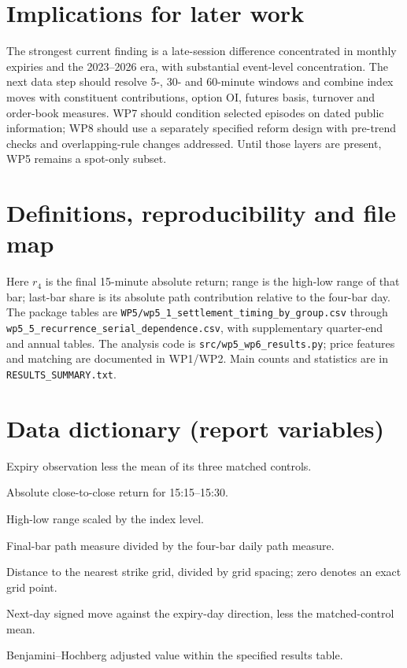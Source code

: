\documentclass[11pt,a4paper]{article}
\begin{document}
\section{Implications for later work}
The strongest current finding is a late-session difference concentrated in monthly expiries and the 2023--2026 era, with substantial event-level concentration. The next data step should resolve 5-, 30- and 60-minute windows and combine index moves with constituent contributions, option OI, futures basis, turnover and order-book measures. WP7 should condition selected episodes on dated public information; WP8 should use a separately specified reform design with pre-trend checks and overlapping-rule changes addressed. Until those layers are present, WP5 remains a spot-only subset.

\appendix
\section{Definitions, reproducibility and file map}
Here $r_4$ is the final 15-minute absolute return; range is the high-low range of that bar; last-bar share is its absolute path contribution relative to the four-bar day. The package tables are \texttt{WP5/wp5\_1\_settlement\_timing\_by\_group.csv} through \texttt{wp5\_5\_recurrence\_serial\_dependence.csv}, with supplementary quarter-end and annual tables. The analysis code is \texttt{src/wp5\_wp6\_results.py}; price features and matching are documented in WP1/WP2. Main counts and statistics are in \texttt{RESULTS\_SUMMARY.txt}.

\section{Data dictionary (report variables)}
\begin{description}[style=nextline]
\item[Expiry-minus-control difference] Expiry observation less the mean of its three matched controls.
\item[Final-bar absolute return] Absolute close-to-close return for 15:15--15:30.
\item[Final-bar range] High-low range scaled by the index level.
\item[Last-bar share] Final-bar path measure divided by the four-bar daily path measure.
\item[Fractional strike distance] Distance to the nearest strike grid, divided by grid spacing; zero denotes an exact grid point.
\item[Reversal difference] Next-day signed move against the expiry-day direction, less the matched-control mean.
\item[BH q-value] Benjamini--Hochberg adjusted value within the specified results table.
\end{description}
\end{document}
